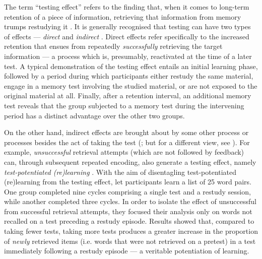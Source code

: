 \documentclass[../main.tex]{subfiles}
\begin{document}
The term ``testing effect'' refers to the finding that, when it comes to long-term retention of a piece of information, retrieving that information from memory trumps restudying it \citep{roedigeriiiPowerTestingMemory2006, roedigeriiiTestEnhancedLearningTaking2006, rowlandEffectTestingRestudy2014, adesopeRethinkingUseTests2017, roedigeriiiCriticalRoleRetrieval2011, gloverTestingPhenomenonNot1989}. It is generally recognised that testing can have two types of effects --- \textit{direct} and \textit{indirect} \citep{arnoldTestpotentiatedLearningDistinguishing2013, roedigeriiiPowerTestingMemory2006}. Direct effects refer specifically to the increased retention that ensues from repeatedly \textit{successfully} retrieving the target information --- a process which is, presumably, reactivated at the time of a later test. A typical demonstration of the testing effect entails an initial learning phase, followed by a period during which participants either restudy the same material, engage in a memory test involving the studied material, or are not exposed to the original material at all. Finally, after a retention interval, an additional memory test reveals that the group subjected to a memory test during the intervening period has a distinct advantage over the other two groups. 

On the other hand, indirect effects are brought about by some other process or processes besides the act of taking the test (\citealp{roedigeriiiPowerTestingMemory2006}; but for a different view, see \citealp{kornellRetrievalAttemptsEnhance2015}). For example, \textit{unsuccessful} retrieval attempts (which are not followed by feedback) can, through subsequent repeated encoding, also generate a testing effect, namely \textit{test-potentiated (re)learning} \citep{izawaReinforcementTestSequencesPairedAssociate1966,izawaOptimalPotentiatingEffects1970, kornellUnsuccessfulRetrievalAttempts2009, arnoldFreeRecallEnhances2013, arnoldTestpotentiatedLearningDistinguishing2013, wissmanTestpotentiatedLearningThree2018}. With the aim of disentagling test-potentiated (re)learning from the testing effect, \cite{arnoldTestpotentiatedLearningDistinguishing2013} let participants learn a list of 25 word pairs. One group completed nine cycles comprising a single test and a restudy session, while another completed three cycles. In order to isolate the effect of unsuccessful from successful retrieval attempts, they focused their analysis only on words not recalled on a test preceding a restudy episode. Results showed that, compared to taking fewer tests, taking more tests produces a greater increase in the proportion of \textit{newly} retrieved items (i.e. words that were not retrieved on a pretest) in a test immediately following a restudy episode --- a veritable potentiation of learning.
\end{document}
